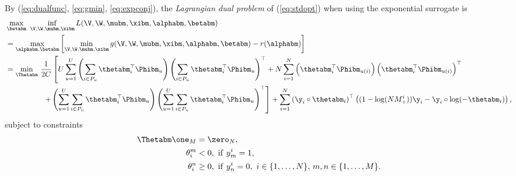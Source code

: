 By (\ref{eq:dualfunc}, \ref{eq:gmin}, \ref{eq:expconj}), the \emph{Lagrangian dual problem} of (\ref{eq:stdopt}) when using the exponential surrogate is
\begin{equation*}
\begin{aligned}
&\max_{\betabm} \ \inf_{\V, \W, \mubm, \xibm} L(\V, \W, \mubm, \xibm, \alphabm, \betabm) \\
&= \max_{\alphabm, \betabm} \left[ \min_{\V, \W, \mubm, \xibm} g(\V, \W, \mubm, \xibm, \alphabm, \betabm) - r(\alphabm) \right] \\
&= \min_{\Thetabm} \, \frac{1}{2 C} \left[
     U \sum_{u=1}^U \left( \sum_{i \in P_u} \thetabm_i^\top \Phibm_u \right) \left( \sum_{i \in P_u} \thetabm_i^\top \Phibm_u \right)^\top
   + N \sum_{i=1}^N \left( \thetabm_i^\top \Phibm_{u(i)} \right) \left( \thetabm_i^\top \Phibm_{u(i)} \right)^\top \right. \\
& \hspace{5em} \left.
   + \left( \sum_{u=1}^U \sum_{i \in P_u} \thetabm_i^\top \Phibm_u \right)
     \left( \sum_{u=1}^U \sum_{i \in P_u} \thetabm_i^\top \Phibm_u \right)^\top \right]
   + \sum_{i=1}^N \left( \y_i \circ \thetabm_i \right)^\top 
     \left( (1 - \log(N M_+^i)) \y_i - \y_i \circ \log(-\thetabm_i) \right),
\end{aligned}
\end{equation*}
subject to constraints
\begin{equation*}
\begin{aligned}
\Thetabm \one_M &= \zero_N, \\
\theta_i^m & < 0, \ \mathrm{if} \ y_m^i = 1, \\
\theta_i^n & \ge 0, \ \mathrm{if} \ y_n^i = 0, \ i \in \{1,\dots,N\}, \, m,n \in \{1,\dots,M\}.
\end{aligned}
\end{equation*}
